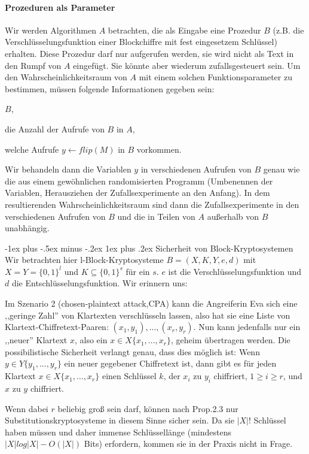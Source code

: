 \documentclass[a4paper]{article}
\makeatletter
\renewcommand{\subsubsection}{\@startsection{subsubsection}{3}{0mm}%
 {-1ex plus -.5ex minus -.2ex}%
 {1ex plus .2ex}%
 {\normalfont\small\bfseries}}
\makeatother
\begin{document}
\begin{multicols}{3}
    \paragraph{Prozeduren als Parameter}
    Wir werden Algorithmen $A$ betrachten, die als Eingabe eine Prozedur $B$ (z.B. die Verschlüsselungsfunktion einer Blockchiffre mit fest eingesetzem Schlüssel) erhalten. Diese Prozedur darf nur aufgerufen werden, sie wird nicht als Text in den Rumpf von $A$ eingefügt. Sie könnte aber wiederum zufallsgesteuert sein. Um den Wahrscheinlichkeitsraum von $A$ mit einem solchen Funktionsparameter zu bestimmen, müssen folgende Informationen gegeben sein:
    \begin{itemize*}
        \item $B$,
        \item die Anzahl der Aufrufe von $B$ in $A$,
        \item welche Aufrufe $y\leftarrow flip(M)$ in $B$ vorkommen.
    \end{itemize*}

    Wir behandeln dann die Variablen $y$ in verschiedenen Aufrufen von $B$ genau wie die aus einem gewöhnlichen randomisierten Programm (Umbenennen der Variablen, Herausziehen der Zufallsexperimente an den Anfang). In dem resultierenden Wahrscheinlichkeitsraum sind dann die Zufallsexperimente in den verschiedenen Aufrufen von $B$ und die in Teilen von $A$ außerhalb von $B$ unabhängig.

    \subsubsection{Sicherheit von Block-Kryptosystemen}
    Wir betrachten hier l-Block-Kryptosysteme $B=(X,K,Y,e,d)$ mit $X=Y=\{0,1\}^l$ und $K\subseteq\{0,1\}^s$ für ein $s$. $e$ ist die Verschlüsselungsfunktion und $d$ die Entschlüsselungsfunktion. Wir erinnern uns:
    \begin{enumerate*}
        \item Im Szenario 2 (chosen-plaintext attack,CPA) kann die Angreiferin Eva sich eine ,,geringe Zahl'' von Klartexten verschlüsseln lassen, also hat sie eine Liste von Klartext-Chiffretext-Paaren: $(x_1,y_1),...,(x_r,y_r)$. Nun kann jedenfalls nur ein ,,neuer'' Klartext $x$, also ein $x\in X\{x_1,...,x_r\}$, geheim übertragen werden. Die possibilistische Sicherheit verlangt genau, dass dies möglich ist: Wenn $y\in Y\{y_1,...,y_r\}$ ein neuer gegebener Chiffretext ist, dann gibt es für jeden Klartext $x\in X\{x_1,...,x_r\}$ einen Schlüssel $k$, der $x_i$ zu $y_i$ chiffriert, $1 \geq i\geq r$, und $x$ zu $y$ chiffriert.
        \item  Wenn dabei $r$ beliebig groß sein darf, können nach Prop.2.3 nur Substitutionskryptosysteme in diesem Sinne sicher sein. Da sie $|X|!$ Schlüssel haben müssen und daher immense Schlüssellänge (mindestens $|X|log|X|-O(|X|)$ Bits) erfordern, kommen sie in der Praxis nicht in Frage.
    \end{enumerate*}


\end{multicols}
\end{document}
